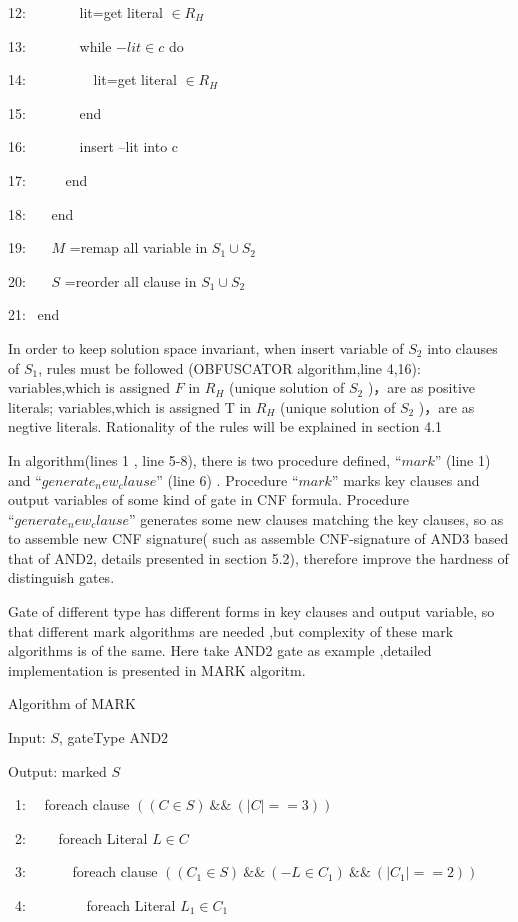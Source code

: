 \documentclass[runningheads,a4paper]{llncs}
\begin{document}
12:~~~~~~~    	 lit=get literal $\in R_H$

13:~~~~~~~    	 while $-lit \in c$ do

14:~~~~~~~~~          lit=get literal $ \in R_H $

15:~~~~~~~        end 

16:~~~~~~~	      insert –lit into c

17:~~~~~     end 

18:~~~   end 

19:~~~   $M$ =remap all variable in $ S_1 \cup S_2$

20:~~~   $S$ =reorder all clause in $S_1 \cup S_2$

21:~  end

In order to keep solution space invariant, when insert variable of $S_2$ into clauses of $S_1$, rules must be followed (OBFUSCATOR algorithm,line 4,16):
variables,which is assigned $F$ in $R_H$ (unique solution of $S_2$ )，are as positive literals;
variables,which is assigned T in $R_H$ (unique solution of $S_2$ )，are as negtive literals. 
Rationality of the rules will be explained in section 4.1

In algorithm(lines 1 , line 5-8), there is two procedure defined, $“mark”$ (line 1) and $“generate_new_clause”$ (line 6) . 
Procedure $“mark”$ marks key clauses and output variables of some kind of gate in CNF formula.
Procedure $“generate_new_clause”$ generates some new clauses matching the key clauses, so as to  assemble new CNF signature( such as assemble CNF-signature of AND3 based that of AND2, 
details presented in section 5.2), therefore improve the hardness of distinguish gates.

Gate of different type has different forms in key clauses and output variable, so that different mark algorithms are needed ,but complexity of these mark algorithms is of the same. 
Here take AND2 gate as example ,detailed implementation is presented in MARK algoritm.  

\noindent Algorithm of MARK

Input: $S$, gateType AND2

Output: marked $S$ 

~1:~~  foreach clause $((C \in S) ~\&\&~ (|C|==3))$

~2:~~~~    foreach Literal $L \in C$ 

~3:~~~~~~	   foreach clause $((C_1 \in S) ~\&\&~ (-L\in C_1)~ \&\&~ (|C_1|==2)) $

~4:~~~~~~~~		foreach Literal $ L_1 \in C_1$ 
\end{document}
